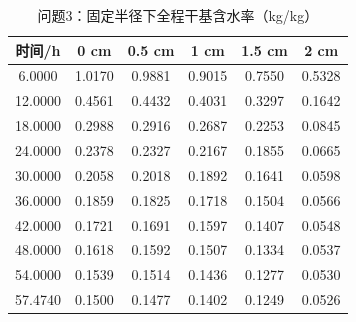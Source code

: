 \begin{table}[H]\centering
\caption{问题3：固定半径下全程干基含水率（kg/kg）}\label{tab:q3}
\begin{tabular}{cccccc}\toprule
时间/h & 0 cm & 0.5 cm & 1 cm & 1.5 cm & 2 cm\\ \midrule
6.0000 & 1.0170 & 0.9881 & 0.9015 & 0.7550 & 0.5328\\
12.0000 & 0.4561 & 0.4432 & 0.4031 & 0.3297 & 0.1642\\
18.0000 & 0.2988 & 0.2916 & 0.2687 & 0.2253 & 0.0845\\
24.0000 & 0.2378 & 0.2327 & 0.2167 & 0.1855 & 0.0665\\
30.0000 & 0.2058 & 0.2018 & 0.1892 & 0.1641 & 0.0598\\
36.0000 & 0.1859 & 0.1825 & 0.1718 & 0.1504 & 0.0566\\
42.0000 & 0.1721 & 0.1691 & 0.1597 & 0.1407 & 0.0548\\
48.0000 & 0.1618 & 0.1592 & 0.1507 & 0.1334 & 0.0537\\
54.0000 & 0.1539 & 0.1514 & 0.1436 & 0.1277 & 0.0530\\
57.4740 & 0.1500 & 0.1477 & 0.1402 & 0.1249 & 0.0526\\
\bottomrule\end{tabular}\end{table}
